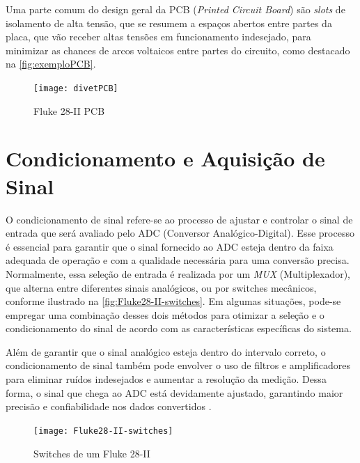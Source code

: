 Uma parte comum do design geral da \gls{PCB} (\textit{Printed Circuit Board}) são \textit{slots} de isolamento de alta tensão, que se resumem a espaços abertos entre partes da placa, que vão receber altas tensões em funcionamento indesejado, para minimizar as chances de arcos voltaicos entre partes do circuito, como destacado na \autoref{fig:exemploPCB}. %

\begin{figure}[htb!]%
    \caption{Fluke 28-II PCB}%
    \label{fig:exemploPCB}%
    \texttt{[image: divetPCB]}%
\end{figure}

\section{Condicionamento e Aquisição de Sinal}\label{sec:signalConditioningandPathing}

O condicionamento de sinal refere-se ao processo de ajustar e controlar o sinal de entrada que será avaliado pelo ADC (Conversor Analógico-Digital). Esse processo é essencial para garantir que o sinal fornecido ao ADC esteja dentro da faixa adequada de operação e com a qualidade necessária para uma conversão precisa. Normalmente, essa seleção de entrada é realizada por um \textit{MUX} (Multiplexador), que alterna entre diferentes sinais analógicos, ou por switches mecânicos, conforme ilustrado na \autoref{fig:Fluke28-II-switches}. Em algumas situações, pode-se empregar uma combinação desses dois métodos para otimizar a seleção e o condicionamento do sinal de acordo com as características específicas do sistema.

Além de garantir que o sinal analógico esteja dentro do intervalo correto, o condicionamento de sinal também pode envolver o uso de filtros e amplificadores para eliminar ruídos indesejados e aumentar a resolução da medição. Dessa forma, o sinal que chega ao ADC está devidamente ajustado, garantindo maior precisão e confiabilidade nos dados convertidos \cite{dmmblog}.

\begin{figure}[htb!]%
    \caption{Switches de um Fluke 28-II}%
    \label{fig:Fluke28-II-switches}%
    \texttt{[image: Fluke28-II-switches]}%
\end{figure}

